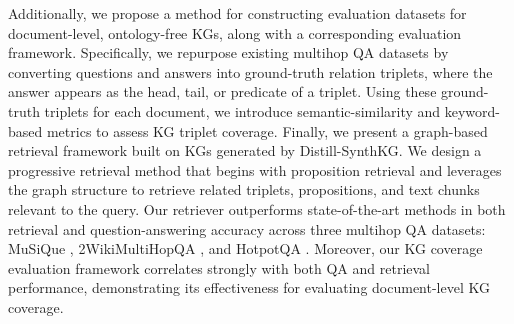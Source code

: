 \documentclass{article} %
\begin{document}
Additionally, we propose a method for constructing evaluation datasets for document-level, ontology-free KGs, along with a corresponding evaluation framework. Specifically, we repurpose existing multihop QA datasets by converting questions and answers into ground-truth relation triplets, where the answer appears as the head, tail, or predicate of a triplet. Using these ground-truth triplets for each document, we introduce semantic-similarity and keyword-based metrics to assess KG triplet coverage. Finally, we present a graph-based retrieval framework built on KGs generated by Distill-SynthKG. We design a progressive retrieval method that begins with proposition retrieval and leverages the graph structure to retrieve related triplets, propositions, and text chunks relevant to the query. Our retriever outperforms state-of-the-art methods in both retrieval and question-answering accuracy across three multihop QA datasets: MuSiQue \citep{trivedi-etal-2022-musique}, 2WikiMultiHopQA \citep{xanh2020_2wikimultihop}, and HotpotQA \citep{yang-etal-2018-hotpotqa}. Moreover, our KG coverage evaluation framework correlates strongly with both QA and retrieval performance, demonstrating its effectiveness for evaluating document-level KG coverage.
\end{document}
